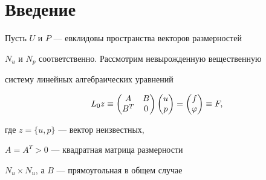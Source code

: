 

\pagestyle{plain} %







\maketitle


\label{begin}








\section*{Введение}





Пусть $U$ и $P$ --- евклидовы пространства векторов размерностей


$N_u$ и $N_p$ соответственно. Рассмотрим невырожденную вещественную 


систему линейных алгебраических уравнений


\begin{equation}


\label{sys0}


L_{0} z \equiv\begin{pmatrix}


A & B \\ B^T & 0 \end{pmatrix}


\begin{pmatrix}


u \\ p \end{pmatrix}


=\begin{pmatrix}


f \\  \zp \end{pmatrix} \equiv F,


\end{equation}


где $z=\{u,p\}$ --- вектор неизвестных,


$A = A^T > 0$ --- квадратная матрица размерности


$N_u \times N_u$, а $B$ --- прямоугольная в общем случае


